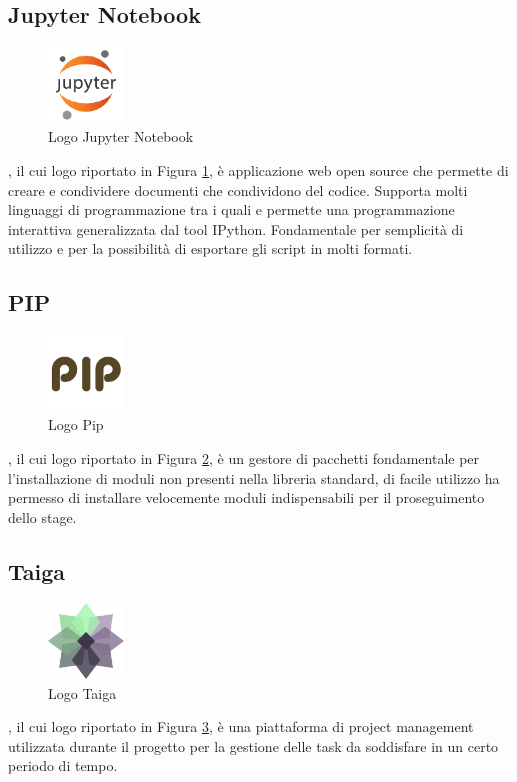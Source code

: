 \subsection{Jupyter Notebook}
\begin{figure}[H]
	\begin{center} \includegraphics[width=2cm]{figures/jupyter}
		\caption[Logo Jupyter Notebook]{Logo Jupyter Notebook}
		\label{logo_jupyter} 
	\end{center}
\end{figure}
, il cui logo riportato in Figura \ref{logo_jupyter}, è applicazione web open source che permette di creare e condividere documenti che condividono del codice. Supporta molti linguaggi di programmazione tra i quali  e permette una programmazione interattiva generalizzata dal tool IPython. Fondamentale per semplicità di utilizzo e per la possibilità di esportare gli script in molti formati.

\subsection{PIP}
\begin{figure}[H]
	\begin{center} \includegraphics[width=2cm]{figures/pip}
		\caption[Logo Pip]{Logo Pip}
		\label{logo_pip} 
	\end{center}
\end{figure}
, il cui logo riportato in Figura \ref{logo_pip}, è un gestore di pacchetti  fondamentale per l'installazione di moduli non presenti nella libreria standard, di facile utilizzo ha permesso di installare velocemente moduli indispensabili per il proseguimento dello stage.

\subsection{Taiga}
\begin{figure}[H]
	\begin{center} \includegraphics[width=2cm]{figures/taiga}
		\caption[Logo Taiga]{Logo Taiga}
		\label{logo_taiga} 
	\end{center}
\end{figure}
, il cui logo riportato in Figura \ref{logo_taiga}, è una piattaforma di project management utilizzata durante il progetto per la gestione delle task da soddisfare in un certo periodo di tempo.